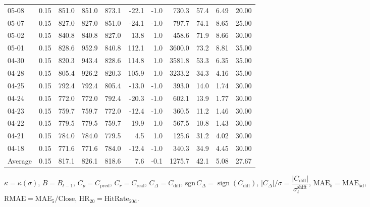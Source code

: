 \begin{threeparttable}
{\begin{tabular}{lrrrrrrrrrr}
05-08 & 0.15 & 851.0 & 851.0 & 873.1 & -22.1 & -1.0 & 730.3 & 57.4 & 6.49 & 20.00 \\
05-07 & 0.15 & 827.0 & 827.0 & 851.0 & -24.1 & -1.0 & 797.7 & 74.1 & 8.65 & 25.00 \\
05-02 & 0.15 & 840.8 & 840.8 & 827.0 & 13.8 & 1.0 & 458.6 & 71.9 & 8.66 & 30.00 \\
05-01 & 0.15 & 828.6 & 952.9 & 840.8 & 112.1 & 1.0 & 3600.0 & 73.2 & 8.81 & 35.00 \\
04-30 & 0.15 & 820.3 & 943.4 & 828.6 & 114.8 & 1.0 & 3581.8 & 53.3 & 6.35 & 35.00 \\
04-28 & 0.15 & 805.4 & 926.2 & 820.3 & 105.9 & 1.0 & 3233.2 & 34.3 & 4.16 & 35.00 \\
04-25 & 0.15 & 792.4 & 792.4 & 805.4 & -13.0 & -1.0 & 393.0 & 14.0 & 1.74 & 30.00 \\
04-24 & 0.15 & 772.0 & 772.0 & 792.4 & -20.3 & -1.0 & 602.1 & 13.9 & 1.77 & 30.00 \\
04-23 & 0.15 & 759.7 & 759.7 & 772.0 & -12.4 & -1.0 & 360.5 & 11.2 & 1.46 & 30.00 \\
04-22 & 0.15 & 779.5 & 779.5 & 759.7 & 19.9 & 1.0 & 567.5 & 10.8 & 1.43 & 30.00 \\
04-21 & 0.15 & 784.0 & 784.0 & 779.5 & 4.5 & 1.0 & 125.6 & 31.2 & 4.02 & 30.00 \\
04-18 & 0.15 & 771.6 & 771.6 & 784.0 & -12.4 & -1.0 & 340.3 & 34.9 & 4.45 & 30.00 \\
Average & 0.15 & 817.1 & 826.1 & 818.6 & 7.6 & -0.1 & 1275.7 & 42.1 & 5.08 & 27.67 \\
\bottomrule
\end{tabular}
}%
\begin{tablenotes}\footnotesize
\item $\kappa=\kappa(\sigma)$, $B=B_{t-1}$, $C_p=C_{\text{pred}}$, $C_r=C_{\text{real}}$, $C_\Delta=C_{\text{diff}}$, $\mathrm{sgn}\,C_\Delta=\operatorname{sign}(C_{\text{diff}})$, $|C_\Delta|/\sigma=\dfrac{|C_{\text{diff}}|}{\sigma_t^{\text{shift}}}$, $\mathrm{MAE}_5=\mathrm{MAE}_{5\text{d}}$, $\mathrm{RMAE}= \mathrm{MAE}_5 / \text{Close}$, $\mathrm{HR}_{20}=\mathrm{HitRate}_{20\text{d}}$.
\end{tablenotes}
\end{threeparttable}
\endgroup
